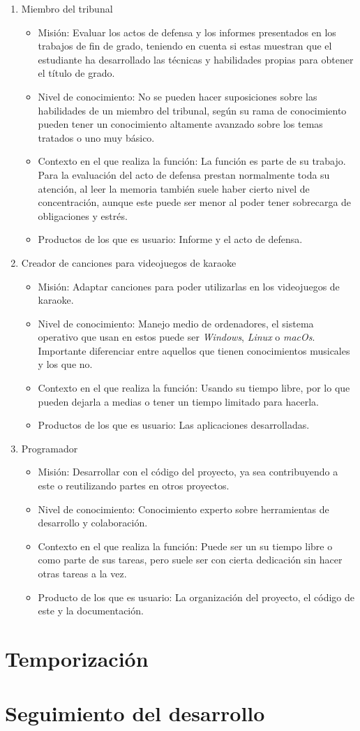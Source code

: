 \begin{enumerate}	
	\item{Miembro del tribunal}
	\begin{itemize}
		\item{Misión: Evaluar los actos de defensa y los informes presentados en los trabajos de fin de grado, teniendo en cuenta si estas muestran que el estudiante ha desarrollado las técnicas y habilidades propias para obtener el título de grado.}
		\item{Nivel de conocimiento: No se pueden hacer suposiciones sobre las habilidades de un miembro del tribunal, según su rama de conocimiento pueden tener un conocimiento altamente avanzado sobre los temas tratados o uno muy básico.}
		\item{Contexto en el que realiza la función: La función es parte de su trabajo. Para la evaluación del acto de defensa prestan normalmente toda su atención, al leer la memoria también suele haber cierto nivel de concentración, aunque este puede ser menor al poder tener sobrecarga de obligaciones y estrés.}
		\item{Productos de los que es usuario: Informe y el acto de defensa.}
	\end{itemize}
	
	\item{Creador de canciones para videojuegos de karaoke}
	\begin{itemize}
		\item{Misión: Adaptar canciones para poder utilizarlas en los videojuegos de karaoke.}
		\item{Nivel de conocimiento: Manejo medio de ordenadores, el sistema operativo que usan en estos puede ser \textit{Windows}, \textit{Linux} o \textit{macOs}. Importante diferenciar entre aquellos que tienen conocimientos musicales y los que no.}
		\item{Contexto en el que realiza la función: Usando su tiempo libre, por lo que pueden dejarla a medias o tener un tiempo limitado para hacerla.}
		\item{Productos de los que es usuario: Las aplicaciones desarrolladas.}
	\end{itemize}
	
		\item{Programador}
	\begin{itemize}
		\item{Misión: Desarrollar con el código del proyecto, ya sea contribuyendo a este o reutilizando partes en otros proyectos.}
		\item{Nivel de conocimiento: Conocimiento experto sobre herramientas de desarrollo y colaboración.}
		\item{Contexto en el que realiza la función: Puede ser un su tiempo libre o como parte de sus tareas, pero suele ser con cierta dedicación sin hacer otras tareas a la vez.}
		\item{Producto de los que es usuario: La organización del proyecto, el código de este y la documentación.}
	\end{itemize}
\end{enumerate}




\section{Temporización}

\section{Seguimiento del desarrollo}
